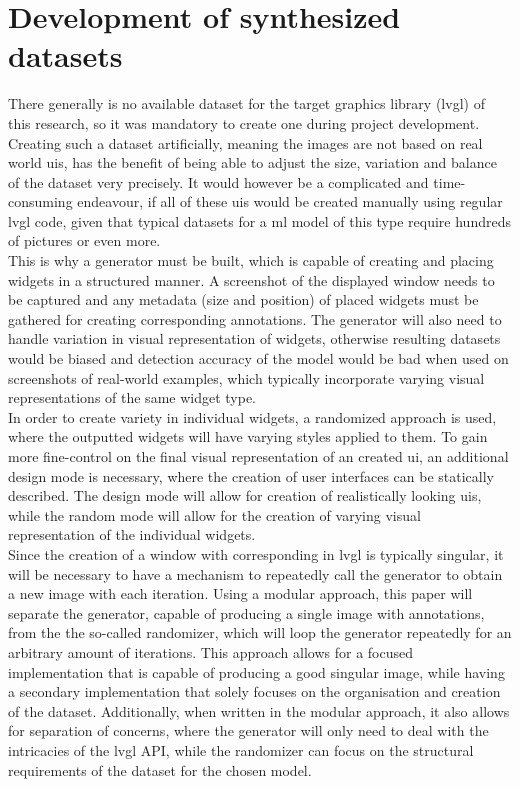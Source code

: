 \documentclass[Bachelor, BIC, english, fhCitStyle, IEEE]{BASE/twbook} %
\begin{document}
\chapter{Development of synthesized datasets}
There generally is no available dataset for the target graphics library (\ac{lvgl}) of this research, so it was mandatory to create one during project development. Creating such a dataset artificially, meaning the images are not based on real world \acp{ui}, has the benefit of being able to adjust the size, variation and balance of the dataset very precisely. It would however be a complicated and time-consuming endeavour, if all of these \aclp{ui} would be created manually using regular \ac{lvgl} code, given that typical datasets for a \ac{ml} model of this type require hundreds of pictures or even more.\\
This is why a generator must be built, which is capable of creating and placing widgets in a structured manner. A screenshot of the displayed window needs to be captured and any metadata (size and position) of placed widgets must be gathered for creating corresponding annotations. The generator will also need to handle variation in visual representation of widgets, otherwise resulting datasets would be biased and detection accuracy of the model would be bad when used on screenshots of real-world examples, which typically incorporate varying visual representations of the same widget type.\\
In order to create variety in individual widgets, a randomized approach is used, where the outputted widgets will have varying styles applied to them. To gain more fine-control on the final visual representation of an created \ac{ui}, an additional design mode is necessary, where the creation of user interfaces can be statically described. The design mode will allow for creation of realistically looking \acp{ui}, while the random mode will allow for the creation of varying visual representation of the individual widgets.\\
Since the creation of a window with corresponding in \ac{lvgl} is typically singular, it will be necessary to have a mechanism to repeatedly call the generator to obtain a new image with each iteration. Using a modular approach, this paper will separate the generator, capable of producing a single image with annotations, from the the so-called randomizer, which will loop the generator repeatedly for an arbitrary amount of iterations. This approach allows for a focused implementation that is capable of producing a good singular image, while having a secondary implementation that solely focuses on the organisation and creation of the dataset. Additionally, when written in the modular approach, it also allows for separation of concerns, where the generator will only need to deal with the intricacies of the \ac{lvgl} API, while the randomizer can focus on the structural requirements of the dataset for the chosen model.\\
\end{document}
